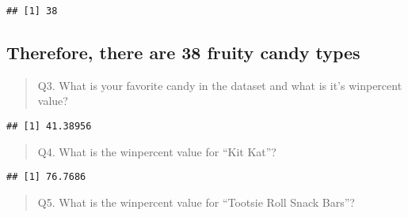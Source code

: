 \documentclass[
]{article}
\newenvironment{Shaded}{\begin{snugshade}}{\end{snugshade}}
\newcommand{\CommentTok}[1]{\textcolor[rgb]{0.56,0.35,0.01}{\textit{#1}}}
\newcommand{\NormalTok}[1]{#1}
\newcommand{\SpecialCharTok}[1]{\textcolor[rgb]{0.00,0.00,0.00}{#1}}
\newcommand{\StringTok}[1]{\textcolor[rgb]{0.31,0.60,0.02}{#1}}
\begin{document}
\begin{verbatim}
## [1] 38
\end{verbatim}

\hypertarget{therefore-there-are-38-fruity-candy-types}{%
\subsection{Therefore, there are 38 fruity candy
types}\label{therefore-there-are-38-fruity-candy-types}}

\begin{quote}
Q3. What is your favorite candy in the dataset and what is it's
winpercent value?
\end{quote}

\begin{Shaded}
\end{Shaded}

\begin{verbatim}
## [1] 41.38956
\end{verbatim}

\begin{quote}
Q4. What is the winpercent value for ``Kit Kat''?
\end{quote}

\begin{Shaded}
\end{Shaded}

\begin{verbatim}
## [1] 76.7686
\end{verbatim}

\begin{quote}
Q5. What is the winpercent value for ``Tootsie Roll Snack Bars''?
\end{quote}

\begin{Shaded}
\end{Shaded}
\end{document}

